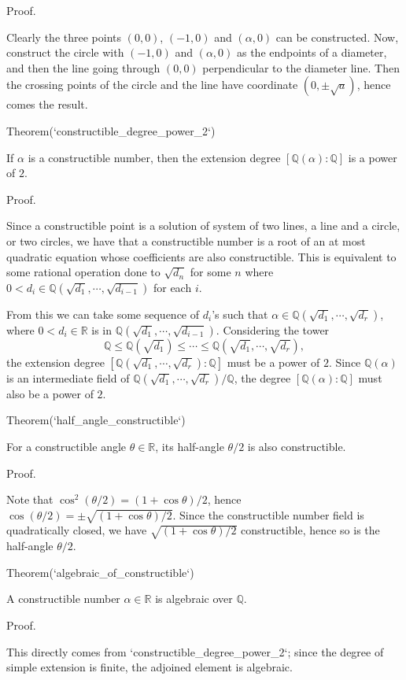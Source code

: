 \documentclass{article}
\begin{document}
Proof.

Clearly the three points $(0, 0)$, $(-1, 0)$ and $(\alpha, 0)$ can be constructed. Now, construct the circle with $(-1, 0)$ and $(\alpha, 0)$ as the endpoints of a diameter, and then the line going through $(0, 0)$ perpendicular to the diameter line. Then the crossing points of the circle and the line have coordinate $(0, \pm \sqrt{a})$, hence comes the result.

Theorem(`constructible_degree_power_2`)

If $\alpha$ is a constructible number, then the extension degree $[\mathbb{Q}(\alpha) : \mathbb{Q}]$ is a power of $2$.

Proof.

Since a constructible point is a solution of system of two lines, a line and a circle, or two circles, we have that a constructible number is a root of an at most quadratic equation whose coefficients are also constructible. This is equivalent to some rational operation done to $\sqrt{d_n}$ for some $n$ where $0 < d_i \in \mathbb{Q}(\sqrt{d_1}, \cdots, \sqrt{d_{i - 1}})$ for each $i$.

From this we can take some sequence of $d_i$'s such that $\alpha \in \mathbb{Q}(\sqrt{d_1}, \cdots, \sqrt{d_r})$, where $0 < d_i \in \mathbb{R}$ is in $\mathbb{Q}(\sqrt{d_1}, \cdots, \sqrt{d_{i - 1}})$. Considering the tower
$$
\mathbb{Q} \le \mathbb{Q}(\sqrt{d_1}) \le \cdots \le \mathbb{Q} (\sqrt{d_1}, \cdots, \sqrt{d_r}),
$$
the extension degree $[\mathbb{Q}(\sqrt{d_1}, \cdots, \sqrt{d_r}) : \mathbb{Q}]$ must be a power of $2$. Since $\mathbb{Q}(\alpha)$ is an intermediate field of $\mathbb{Q}(\sqrt{d_1}, \cdots, \sqrt{d_r}) / \mathbb{Q}$, the degree $[\mathbb{Q}(\alpha) : \mathbb{Q}]$ must also be a power of $2$.

Theorem(`half_angle_constructible`)

For a constructible angle $\theta \in \mathbb{R}$, its half-angle $\theta/2$ is also constructible.

Proof.

Note that $\cos^2 (\theta/2) = (1 + \cos \theta) / 2$, hence $\cos(\theta/2) = \pm \sqrt{(1+\cos\theta)/2}$. Since the constructible number field is quadratically closed, we have $\sqrt{(1+\cos\theta)/2}$ constructible, hence so is the half-angle $\theta/2$.

Theorem(`algebraic_of_constructible`)

A constructible number $\alpha \in \mathbb{R}$ is algebraic over $\mathbb{Q}$.

Proof.

This directly comes from `constructible_degree_power_2`; since the degree of simple extension is finite, the adjoined element is algebraic.
\end{document}
